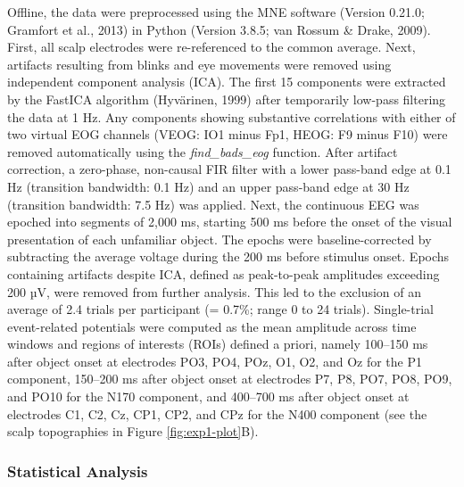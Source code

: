 \documentclass[
  english,
  man,floatsintext]{apa7}
\begin{document}
Offline, the data were preprocessed using the MNE software (Version 0.21.0; Gramfort et al., 2013) in Python (Version 3.8.5; van Rossum \& Drake, 2009). First, all scalp electrodes were re-referenced to the common average. Next, artifacts resulting from blinks and eye movements were removed using independent component analysis (ICA). The first 15 components were extracted by the FastICA algorithm (Hyvärinen, 1999) after temporarily low-pass filtering the data at 1 Hz. Any components showing substantive correlations with either of two virtual EOG channels (VEOG: IO1 minus Fp1, HEOG: F9 minus F10) were removed automatically using the \emph{find\_bads\_eog} function. After artifact correction, a zero-phase, non-causal FIR filter with a lower pass-band edge at 0.1 Hz (transition bandwidth: 0.1 Hz) and an upper pass-band edge at 30 Hz (transition bandwidth: 7.5 Hz) was applied. Next, the continuous EEG was epoched into segments of 2,000 ms, starting 500 ms before the onset of the visual presentation of each unfamiliar object. The epochs were baseline-corrected by subtracting the average voltage during the 200 ms before stimulus onset. Epochs containing artifacts despite ICA, defined as peak-to-peak amplitudes exceeding 200 µV, were removed from further analysis. This led to the exclusion of an average of 2.4 trials per participant (= 0.7\%; range 0 to 24 trials). Single-trial event-related potentials were computed as the mean amplitude across time windows and regions of interests (ROIs) defined a priori, namely 100--150 ms after object onset at electrodes PO3, PO4, POz, O1, O2, and Oz for the P1 component, 150--200 ms after object onset at electrodes P7, P8, PO7, PO8, PO9, and PO10 for the N170 component, and 400--700 ms after object onset at electrodes C1, C2, Cz, CP1, CP2, and CPz for the N400 component (see the scalp topographies in Figure \ref{fig:exp1-plot}B).

\hypertarget{statistical-analysis}{%
\subsubsection{Statistical Analysis}\label{statistical-analysis}}
\end{document}
